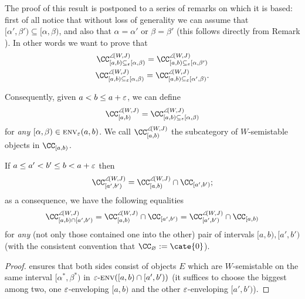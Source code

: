 The proof of this result is postponed to a series of remarks on which it is based: first of all notice that without loss of generality we can assume that $[\alpha',\beta')\subseteq [\alpha,\beta)$, and also that $\alpha=\alpha'$ or $\beta =\beta'$ (this follows directly from Remark ). In other words we want to prove that
\begin{gather*}
\CC^{\semi(W,J)}_{[a,b)\subseteq_\eps  [\alpha,\beta)}=\CC^{\semi(W,J)}_{[a,b)\subseteq_\eps  [\alpha,\beta')}\\
\CC^{\semi(W,J)}_{[a,b)\subseteq_\eps  [\alpha,\beta)}=\CC^{\semi(W,J)}_{[a,b)\subseteq_\eps  [\alpha',\beta)}.
\end{gather*}
\begin{definition}
Consequently, given $a<b\leq a+\varepsilon $, we can define
\[
\CC^{\semi(W,J)}_{[a,b)}=\CC^{\semi(W,J)}_{[a,b)\subseteq_\eps  [\alpha,\beta)}
\]
for \emph{any} $[\alpha,\beta) \in \textsc{env}_\varepsilon(a,b)$. We call $\CC^{\semi(W,J)}_{[a,b)}$ the subcategory of $W$-semistable objects in $\cab$.
\end{definition}
\begin{proposition}
If $a\leq a'<b'\leq b<a+\varepsilon $ then
\[
\CC^{\semi(W,J)}_{ [a',b')}=\CC^{\semi(W,J)}_{[a,b)}\cap \CC_{[a',b')};
\]
as a consequence, we have the following equalities
\[
\CC^{\semi(W,J)}_{[a,b)\cap [a',b')} = \CC^{\semi(W,J)}_{[a,b)}\cap \CC_{[a',b')} = \CC^{\semi(W,J)}_{[a',b')}\cap \cab
\]
for \emph{any} (not only those contained one into the other) pair of intervals $[a,b), [a',b')$ (with the consistent convention that $\CC_\varnothing := \cate{0}$).
\end{proposition}
\begin{proof}
\aprop {} ensures that both sides consist of objects $E$ which are $W$-semistable on the same interval $[\alpha^*,\beta^*)$ in $\varepsilon\text{-}\textsc{env}([a,b)\cap [a',b'))$ (it suffices to choose the biggest among two, one $\varepsilon$-enveloping $[a,b)$ and the other $\varepsilon$-enveloping $[a',b')$).
\end{proof}
